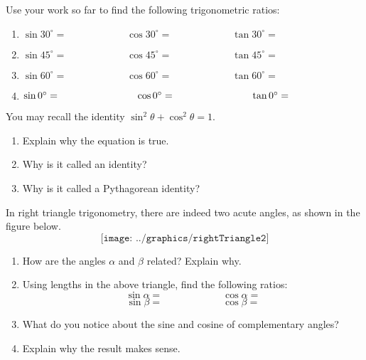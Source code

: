 \begin{prob}
Use your work so far to find the following trigonometric ratios:
\begin{enumerate}
\itemsep 12pt
\item $\sin 30^\circ = \hspace{1in} \cos30^\circ = \hspace{1in} \tan30^\circ =$
\item $\sin 45^\circ = \hspace{1in} \cos45^\circ = \hspace{1in} \tan45^\circ =$
\item $\sin 60^\circ = \hspace{1in} \cos60^\circ = \hspace{1in} \tan60^\circ =$
\item $\sin 0^\circ = \hspace{1.08in} \cos0^\circ = \hspace{1.08in} \tan0^\circ =$
\end{enumerate}
\end{prob}

\vspace{0.2in}

\begin{prob}
You may recall the identity $\sin^2\theta+\cos^2\theta=1$.  
\begin{enumerate}
\item Explain why the equation is true.  
\vspace{0.3in}
\item Why is it called an identity? 
\vspace{0.3in}
\item Why is it called a Pythagorean identity?  
\vspace{0.3in}
\end{enumerate}
\end{prob}

\newpage
\begin{prob}
In right triangle trigonometry, there are indeed two acute angles, as shown in the figure below.
$$\texttt{[image: ../graphics/rightTriangle2]}$$
\begin{enumerate}
\item How are the angles $\alpha$ and $\beta$ related?  Explain why.
\vspace{0.3in}
\item Using lengths in the above triangle, find the following ratios:    
$$\sin\alpha = \qquad\qquad\qquad \cos\alpha = $$
$$\sin\beta = \qquad\qquad\qquad \cos\beta = $$
\item What do you notice about the sine and cosine of complementary angles?  
\vspace{0.3in}
\item Explain why the result makes sense.  
\vspace{0.3in}
\end{enumerate}
\end{prob}

